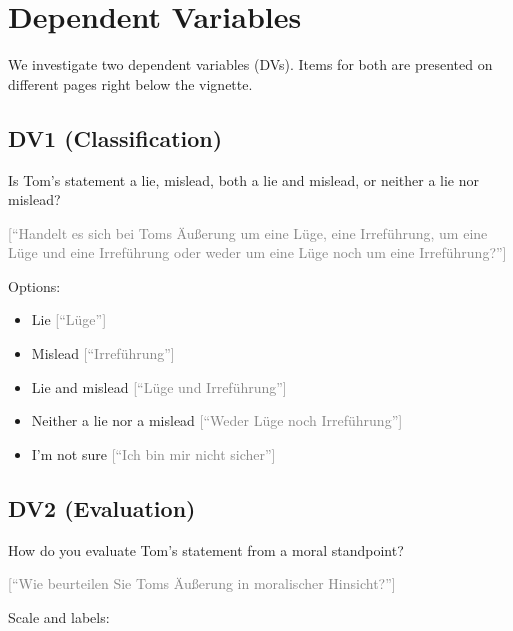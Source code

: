 \documentclass[scrarticle]{scrartcl}
\begin{document}
\section{Dependent Variables}
We investigate two dependent variables (DVs).
Items for both are presented on different pages right below the vignette.


\subsection*{DV1 (Classification)}
Is Tom's statement a lie, mislead, both a lie and mislead, or neither a lie nor mislead?

\vspace{0.75em}
\noindent\textcolor{gray}{[\enquote{Handelt es sich bei Toms Äußerung um eine Lüge, eine Irreführung, um eine Lüge und eine Irreführung oder weder um eine Lüge noch um eine Irreführung?}]}

\vspace{0.75em}
\noindent Options:

\begin{itemize}[label=\Square,noitemsep]
   \item Lie \textcolor{gray}{[\enquote{Lüge}]}
   \item Mislead \textcolor{gray}{[\enquote{Irreführung}]}
   \item Lie and mislead \textcolor{gray}{[\enquote{Lüge und Irreführung}]}
   \item Neither a lie nor a mislead \textcolor{gray}{[\enquote{Weder Lüge noch Irreführung}]}
   \item I'm not sure \textcolor{gray}{[\enquote{Ich bin mir nicht sicher}]}
\end{itemize}


\subsection*{DV2 (Evaluation)}
How do you evaluate Tom's statement from a moral standpoint?

\vspace{0.75em}
\noindent\textcolor{gray}{[\enquote{Wie beurteilen Sie Toms Äußerung in moralischer Hinsicht?}]}

\vspace{0.75em}
\noindent Scale and labels:
\end{document}
